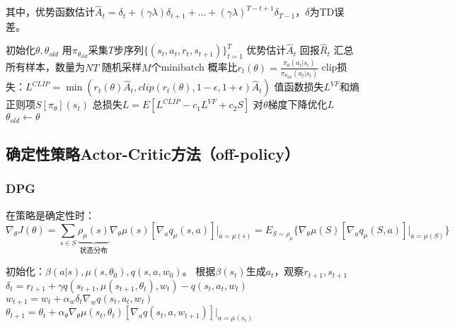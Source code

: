\documentclass[
12pt, %
a4paper, 
oneside, %
headinclude,footinclude, %
]{scrartcl}
\begin{document}
其中，优势函数估计$ \hat{A}_t = \delta_t + (\gamma\lambda)\delta_{t + 1} + \dots + (\gamma\lambda)^{T - t + 1}\delta_{T - 1} $，$ \delta $为TD误差。
\begin{myalgorithm}[PPO]
\State 初始化$ \theta, \theta_{old} $
\State 用$ \pi_{\theta_{old}} $采集$ T $步序列$ \{(s_t, a_t, r_t, s_{t + 1})\}_{t = 1}^T $
\State 优势估计$ \hat{A}_t $
\State 回报$ \hat{R}_t $
\EndFor
\State 汇总所有样本，数量为$ NT $
\State 随机采样$ M $个minibatch
\State 概率比$ r_t(\theta) = \frac{\pi_\theta(a_t|s_t)}{\pi_{\theta_{old}}(a_t|s_t)} $
\State clip损失：$ L^{CLIP} = \min(r_t(\theta)\hat{A}_t, clip(r_t(\theta), 1 - \epsilon, 1 + \epsilon)\hat{A}_t) $
\State 值函数损失$ L^{VF} $和熵正则项$ S[\pi_\theta](s_t) $
\State 总损失$ L = E[L^{CLIP} - c_1 L^{VF} + c_2 S] $
\State 对$ \theta $梯度下降优化$ L $
\EndFor
\State $ \theta_{old} \gets \theta $
\EndFor
\end{myalgorithm}
\subsection[确定性策略Actor-Critic方法]{确定性策略Actor-Critic方法（off-policy）}
\subsubsection[DPG]{DPG}
在策略是确定性时：
$$ \nabla_\theta J(\theta) = \sum_{s \in S} \underbrace{\rho_\mu(s)}_{\text{状态分布}} \nabla_\theta \mu(s)[\nabla_a q_\mu(s, a)]\bigg|_{a = \mu(s)} = E_{S \sim \rho_\mu}\{\nabla_\theta \mu(S)[\nabla_a q_\mu(S, a)]\bigg|_{a =\mu(S)}\} $$
\begin{myalgorithm}
\State 初始化：$ \beta(a|s), \mu(s, \theta_0), q(s, a, w_0) $。
\State 根据$ \beta(s_t) $生成$ a_t $，观察$ r_{t + 1}, s_{t + 1} $
\State $ \delta_t = r_{t + 1} + \gamma q(s_{t + 1}, \mu(s_{t + 1}, \theta_t), w_t) - q(s_t, a_t, w_t) $ 
\State $ w_{t + 1} = w_t + \alpha_w \delta_t \nabla_w q(s_t, a_t, w_t) $ 
\State $ \theta_{t + 1} = \theta_t + \alpha_\theta \nabla_\theta \mu(s_t, \theta_t)[\nabla_a q(s_t, a, w_{t + 1})]|_{a = \mu(s_t)} $ 
\EndFor
\EndFor
\end{myalgorithm}
\end{document}
